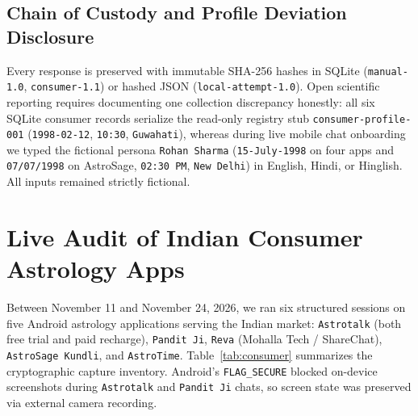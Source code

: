 \subsection{Chain of Custody and Profile Deviation Disclosure}
Every response is preserved with immutable SHA-256 hashes in SQLite (\texttt{manual-1.0}, \texttt{consumer-1.1}) or hashed JSON (\texttt{local-attempt-1.0}). Open scientific reporting requires documenting one collection discrepancy honestly: all six SQLite consumer records serialize the read-only registry stub \texttt{consumer-profile-001} (\texttt{1998-02-12}, \texttt{10:30}, \texttt{Guwahati}), whereas during live mobile chat onboarding we typed the fictional persona \texttt{Rohan Sharma} (\texttt{15-July-1998} on four apps and \texttt{07/07/1998} on AstroSage, \texttt{02:30 PM}, \texttt{New Delhi}) in English, Hindi, or Hinglish. All inputs remained strictly fictional.

\section{Live Audit of Indian Consumer Astrology Apps}
\label{sec:consumer}

Between November 11 and November 24, 2026, we ran six structured sessions on five Android astrology applications serving the Indian market: \texttt{Astrotalk} (both free trial and paid recharge), \texttt{Pandit Ji}, \texttt{Reva} (Mohalla Tech / ShareChat), \texttt{AstroSage Kundli}, and \texttt{AstroTime}. Table~\ref{tab:consumer} summarizes the cryptographic capture inventory. Android's \texttt{FLAG\_SECURE} blocked on-device screenshots during \texttt{Astrotalk} and \texttt{Pandit Ji} chats, so screen state was preserved via external camera recording.

